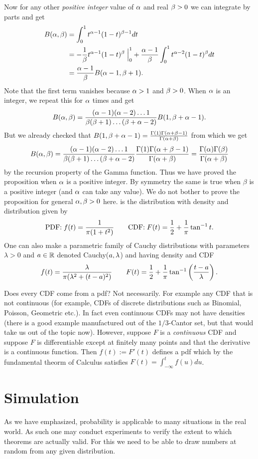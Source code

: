 \documentclass[preprint,  11pt]{amsart}
\begin{document}
Now for any other {\em positive integer} value of $\alpha$ and real $\beta>0$ we can integrate by parts and get
\begin{align*}
B(\alp,\bet)&=\int_{0}^{1}t^{\alp-1}(1-t)^{\bet-1}dt \\
&= -\frac{1}{\bet}t^{\alp-1}(1-t)^{\bet}\given_{0}^{1} + \frac{\alp-1}{\bet}\int_{0}^{1}t^{\alp-2}(1-t)^{\bet}dt \\
&= \frac{\alp-1}{\bet}B(\alp-1,\bet+1).
\end{align*}
Note that the first term vanishes because $\alpha> 1$ and $\beta>0$. When $\alpha$ is an integer, we repeat this for $\alpha$ times and get
$$
B(\alpha,\beta)=\frac{(\alpha-1)(\alpha-2)\ldots 1}{\beta(\beta+1)\ldots (\beta+\alpha-2)}B(1,\beta+\alpha-1).
$$
But we already checked that $B(1,\beta+\alpha-1)=\frac{\Gamma(1)\Gamma(\alpha+\beta-1)}{\Gamma(\alpha+\beta)}$ from which we get
$$
B(\alpha,\beta) = \frac{(\alpha-1)(\alpha-2)\ldots 1}{\beta(\beta+1)\ldots (\beta+\alpha-2)}\frac{\Gamma(1)\Gamma(\alpha+\beta-1)}{\Gamma(\alpha+\beta)} =\frac{\Gamma(\alpha)\Gamma(\beta)}{\Gamma(\alpha+\beta)}
$$
by the recursion property of the Gamma function. Thus we have proved the proposition when $\alpha$ is a positive integer. By symmetry the same is true when $\beta$ is a positive integer (and $\alpha$ can take any value). We do not bother to prove the proposition for general $\alpha,\beta>0$ here.
\eprf
\eeg
\beg {}  is the distribution with density and distribution given by
$$
\mbox{PDF:}\; f(t) = \frac{1}{\pi(1+t^{2})}\qquad
\mbox{CDF:}\; F(t) = \frac{1}{2}+\frac{1}{\pi}\tan^{-1}t.
$$
One can also make a parametric family of Cauchy distributions with parameters $\lambda>0$ and $a\in \mathbb{R}$ denoted Cauchy($a,\lambda$) and having density and CDF
$$
f(t)=\frac{\lambda}{\pi(\lambda^{2}+(t-a)^{2})}\qquad F(t)=\frac{1}{2}+\frac{1}{\pi}\tan^{-1}\left(\frac{t-a}{\lambda}\right).
$$
\eeg

\berk Does every CDF come from a pdf? Not necessarily. For example any CDF that is not continuous (for example, CDFs of discrete distributions such as Binomial, Poisson, Geometric etc.). In fact even continuous CDFs may not have densities (there is a good example manufactured out of the $1/3$-Cantor set, but that would take us out of the topic now). However, suppose $F$ is a {\em continuous} CDF and suppose $F$ is differentiable except at finitely many points and that the derivative is a continuous function. Then $f(t):=F'(t)$ defines a pdf which by the fundamental theorm of Calculus satisfies $F(t)=\int_{-\infty}^{t}f(u)du$.
\eerk

\section{Simulation}
As we have emphasized, probability is applicable to many situations in the real world. As such one may conduct experiments to verify the extent to which theorems are actually valid. For this we need to be able to draw numbers at random from any given distribution.
\end{document}
